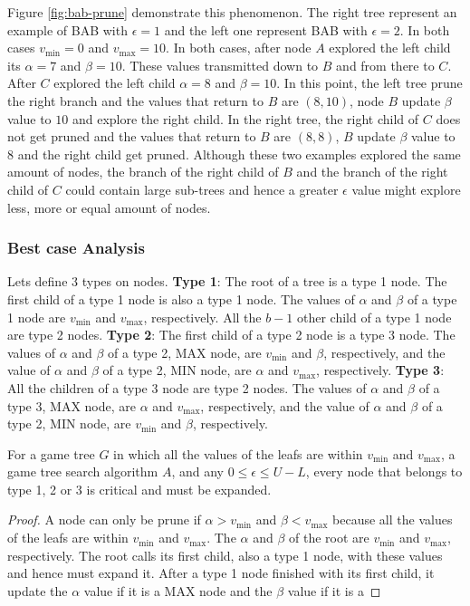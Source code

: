 \documentclass[runningheads]{llncs}
\newcommand{\pess}{\mathit{L}}
\newcommand{\opti}{\mathit{U}}
\newcommand{\vmax}{v_{\text{max}}}
\newcommand{\vmin}{v_{\text{min}}}
\begin{document}
Figure \ref{fig:bab-prune} demonstrate this phenomenon. The right tree represent an example of BAB with $\epsilon = 1$ and the left one represent BAB with $\epsilon = 2$. In both cases $\vmin = 0$ and $\vmax = 10$. In both cases, after node $A$ explored the left child its $\alpha = 7$ and $\beta = 10$. These values transmitted down to $B$ and from there to $C$. After $C$ explored the left child $\alpha = 8$ and $\beta = 10$. In this point, the left tree prune the right branch and the values that return to $B$ are $(8,10)$, node $B$ update $\beta$ value to $10$ and explore the right child. In the right tree, the right child of $C$ does not get pruned and the values that return to $B$ are $(8,8)$, $B$ update $\beta$ value to $8$ and the right child get pruned. Although these two examples explored the same amount of nodes, the branch of the right child of $B$ and the branch of the right child of $C$ could contain large sub-trees and hence a greater $\epsilon$ value might explore less, more or equal amount of nodes. 

\subsubsection{Best case Analysis}
Lets define 3 types on nodes.
\textbf{Type 1}: The root of a tree is a type 1 node. The first child of a type 1 node is also a type 1 node. The values of $\alpha$ and $\beta$ of a type 1 node are $\vmin$ and $\vmax$, respectively. All the $b-1$ other child of a type 1 node are type 2 nodes.
\textbf{Type 2}: The first child of a type 2 node is a type 3 node. 
The values of $\alpha$ and $\beta$ of a type 2, MAX node, are $\vmin$ and $\beta$, respectively, and the value of $\alpha$ and $\beta$ of a type 2, MIN node, are $\alpha$ and $\vmax$, respectively.
\textbf{Type 3}: All the children of a type 3 node are type 2 nodes. The values of $\alpha$ and $\beta$ of a type 3, MAX node, are $\alpha$ and $\vmax$, respectively, and the value of $\alpha$ and $\beta$ of a type 2, MIN node, are $\vmin$ and $\beta$, respectively.

\begin{theorem}
For a game tree $G$ in which all the values of the leafs are within $\vmin$ and $\vmax$, a game tree search algorithm $A$, and any $0 \leq \epsilon \leq \opti - \pess$, every node that  belongs to type 1, 2 or 3 is critical and must be expanded.
\label{the:best}
\end{theorem}
\begin{proof}
A node can only be prune if $\alpha>\vmin$ and $\beta<\vmax$ because all the values of the leafs are within $\vmin$ and $\vmax$. The $\alpha$ and $\beta$ of the root are $\vmin$ and $\vmax$, respectively. The root calls its first child, also a type 1 node, with these values and hence must expand it. After a type 1 node finished with its first child, it update the $\alpha$ value if it is a MAX node and the $\beta$ value if it is a 
\end{proof}
\end{document}

